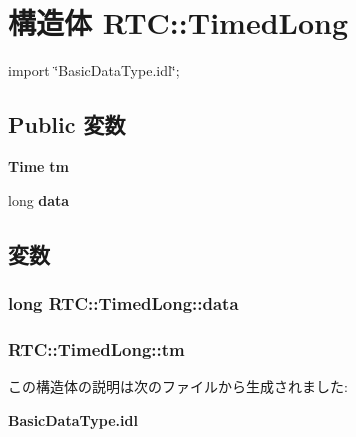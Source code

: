\section{構造体 RTC::TimedLong}
\label{structRTC_1_1TimedLong}


{\ttfamily import \char`\"{}BasicDataType.idl\char`\"{};}

\subsection*{Public 変数}
\begin{DoxyCompactItemize}
\item 
{\bf Time} {\bf tm}
\item 
long {\bf data}
\end{DoxyCompactItemize}


\subsection{変数}
\subsubsection[{data}]{\setlength{\rightskip}{0pt plus 5cm}long {\bf RTC::TimedLong::data}}\label{structRTC_1_1TimedLong_a776b78537c9dad5557a57a88a66b5942}
\subsubsection[{tm}]{ {\bf RTC::TimedLong::tm}}\label{structRTC_1_1TimedLong_a9bba771ba1996f1a2e85de1ce77041b9}


この構造体の説明は次のファイルから生成されました:\begin{DoxyCompactItemize}
\item 
{\bf BasicDataType.idl}\end{DoxyCompactItemize}
